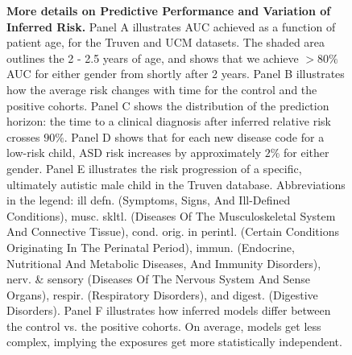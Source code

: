 \documentclass[onecolumn,,10pt]{IEEEtran}
\renewcommand{\captionN}[1]{\caption{\color{CadetBlue4!80!black} \sffamily \fontsize{9}{10}\selectfont #1  }}
\newif\ifFIGS
\def\treatment{positive\xspace}
\begin{document}
\begin{figure}[!ht]
    \captionN{\textbf{More details on Predictive Performance and Variation of Inferred Risk.} Panel A illustrates AUC achieved as a function of
      patient age, for the Truven and UCM datasets. The shaded area outlines the 2 - 2.5  years of age, and  shows that we achieve $>80\%$ AUC for either gender from shortly after 2 years.   Panel B illustrates how the average risk changes with time for the control and the positive cohorts. Panel C shows the distribution of the prediction horizon: the time to a clinical diagnosis after inferred  relative risk crosses $90\%$. Panel D shows that for each new disease code for a low-risk child, ASD risk increases by approximately $2\%$ for either gender. Panel E illustrates the risk progression of a specific, ultimately autistic male child in the Truven database. Abbreviations in the legend: ill defn. (Symptoms, Signs, And Ill-Defined Conditions),   musc. skltl. (Diseases Of The Musculoskeletal System And Connective Tissue), cond. orig. in perintl. (Certain Conditions Originating In The Perinatal Period), immun. (Endocrine, Nutritional And Metabolic Diseases, And Immunity Disorders), nerv. \& sensory (Diseases Of The Nervous System And Sense Organs), respir. (Respiratory Disorders), and digest. (Digestive Disorders). Panel F illustrates  how inferred models differ between the control vs. the \treatment cohorts. On average, models get less complex, implying the exposures get more statistically independent.}\label{fig2}
\end{figure}
\else
{}\label{fig2}
\fi
\ifFIGS
\end{document}
